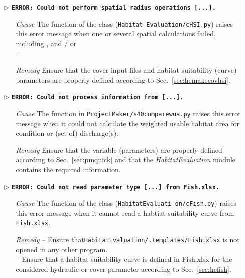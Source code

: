 \begin{itemize}
	\item[$\triangleright$]\textbf{\texttt{ERROR: Could not perform spatial radius operations [...].}}
	\begin{itemize}
		\item[\textit{Cause}\hspace{0.27cm}] The  function of the  class (\texttt{Habitat Evaluation/cHSI.py}) raises this error message when one or several spatial calculations failed, including ,  and / or \\ .
		\item[\textit{Remedy}] Ensure that the cover input files and habitat suitability (curve) parameters are properly defined according to Sec.~\ref{sec:hemakecovhsi}.\\
	\end{itemize}
	
	\item[$\triangleright$]\textbf{\texttt{ERROR: Could not process information from [...].}}
	\begin{itemize}
		\item[\textit{Cause}\hspace{0.27cm}] The  function in \texttt{ProjectMaker/s40{\myUnderscore}compare{\myUnderscore}wua.py} raises this error message when it could not calculate the weighted usable habitat area for condition or (set of) discharge(s).
		\item[\textit{Remedy}] Ensure that the variable (parameters) are properly defined according to Sec.~\ref{sec:pmquick} and that the \textit{HabitatEvaluation} module contains the required information.\\
	\end{itemize}
		
	\item[$\triangleright$]\textbf{\texttt{ERROR: Could not read parameter type [...] from Fish.xlsx.}}
	\begin{itemize}
		\item[\textit{Cause}\hspace{0.27cm}] The  function of the  class (\texttt{HabitatEvaluati on/cFish.py}) raises this error message when it cannot read a habtiat suitability curve from \texttt{Fish.xlsx}.
		\item[\textit{Remedy}] -- Ensure that\texttt{HabitatEvaluation/.templates/Fish.xlsx} is not opened in any other program.\\
							   -- Ensure that a habitat suitability curve is defined in {Fish.xlsx} for the considered hydraulic or cover parameter according to Sec.~\ref{sec:hefish}.\\
	\end{itemize}	
	

\end{itemize}
